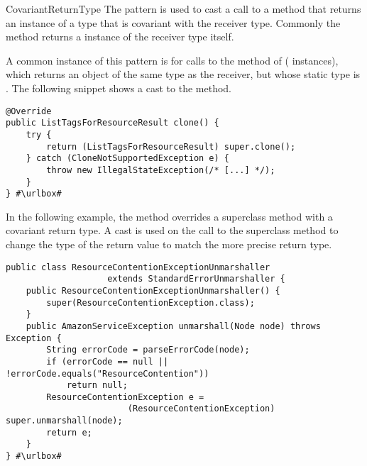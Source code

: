 \begin{pattern}{CovariantReturnType}
The \thisp{} pattern is used to cast a call to a method that returns
an instance of a type that is covariant with the receiver type.
Commonly the method returns a instance of the receiver type itself.

\instances{}
A common instance of this pattern is for calls to the  method of  (\nCovariantReturnTypeCloneSubpattern{} instances),
which returns an object of the same type as the receiver,
but whose static type is .
The following snippet shows a cast to the  method.

\def\urlvar{http://bit.ly/aws_aws_sdk_java_2GvHhYt}
\begin{verbatim}
@Override
public ListTagsForResourceResult clone() {
    try {
        return (ListTagsForResourceResult) super.clone();
    } catch (CloneNotSupportedException e) {
        throw new IllegalStateException(/* [...] */);
    }
} #\urlbox#
\end{verbatim}

In the following example,
the  method overrides a superclass method with a covariant return type.
A cast is used on the call to the superclass method to change the type of the return value to match the more precise return type.

\def\urlvar{http://bit.ly/aws_amplify_aws_sdk_android_2FVWl13}
\begin{verbatim}
public class ResourceContentionExceptionUnmarshaller
                    extends StandardErrorUnmarshaller {
    public ResourceContentionExceptionUnmarshaller() {
        super(ResourceContentionException.class);
    }
    public AmazonServiceException unmarshall(Node node) throws Exception {
        String errorCode = parseErrorCode(node);
        if (errorCode == null || !errorCode.equals("ResourceContention"))
            return null;
        ResourceContentionException e =
                        (ResourceContentionException) super.unmarshall(node);
        return e;
    }
} #\urlbox#
\end{verbatim}


\end{pattern}
